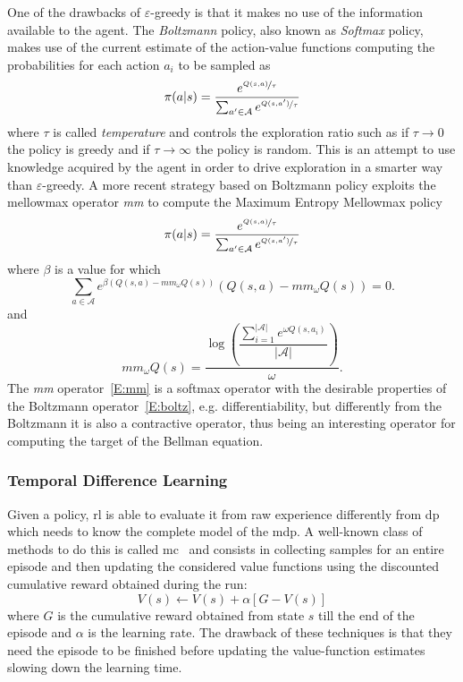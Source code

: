 One of the drawbacks of $\varepsilon$-greedy is that it makes no use of the information available to the agent. The \textit{Boltzmann} policy, also known as \textit{Softmax} policy, makes use of the current estimate of the action-value functions computing the probabilities for each action $a_i$ to be sampled as
\begin{equation}\label{E:boltz}
 \pi(a | s) = \dfrac{e^{\nicefrac{Q(s,a)}{\tau}}}{\sum_{a' \in \mathcal{A}}e^{\nicefrac{Q(s,a')}{\tau}}}
\end{equation}
where $\tau$ is called \textit{temperature} and controls the exploration ratio such as if $\tau \rightarrow 0$ the policy is greedy and if $\tau \rightarrow \infty$ the policy is random. This is an attempt to use knowledge acquired by the agent in order to drive exploration in a smarter way than $\varepsilon$-greedy. A more recent strategy based on Boltzmann policy exploits the mellowmax operator \textit{mm} to compute the Maximum Entropy Mellowmax policy~\cite{asadi2016alternative}
\begin{equation}
 \pi(a | s) = \dfrac{e^{\nicefrac{Q(s,a)}{\tau}}}{\sum_{a' \in \mathcal{A}}e^{\nicefrac{Q(s,a')}{\tau}}}
\end{equation}
where $\beta$ is a value for which
\begin{equation}
 \sum_{a \in \mathcal{A}} e^{\beta(Q(s,a) - mm_\omega Q(s))}(Q(s,a)-mm_\omega Q(s))=0.
\end{equation}
and
\begin{equation}\label{E:mm}
 mm_\omega Q(s) = \dfrac{\log(\dfrac{\sum_{i=1}^{|\mathcal{A}|}e^{\omega Q(s,a_i)}}{|\mathcal{A}|})}{\omega}.
\end{equation}
The \textit{mm} operator~\ref{E:mm} is a softmax operator with the desirable properties of the Boltzmann operator~\ref{E:boltz}, e.g. differentiability, but differently from the Boltzmann it is also a contractive operator, thus being an interesting operator for computing the target of the Bellman equation. 

\subsubsection{Temporal Difference Learning}
Given a policy, \gls{rl} is able to evaluate it from raw experience differently from \gls{dp} which needs to know the complete model of the \gls{mdp}. A well-known class of methods to do this is called \gls{mc}~\cite{robert2013monte} and consists in collecting samples for an entire episode and then updating the considered value functions using the discounted cumulative reward obtained during the run:
\begin{equation}\label{E:mc}
 V(s) \leftarrow V(s) + \alpha [G - V(s)]
\end{equation}
where $G$ is the cumulative reward obtained from state $s$ till the end of the episode and $\alpha$ is the learning rate.
The drawback of these techniques is that they need the episode to be finished before updating the value-function estimates slowing down the learning time.

